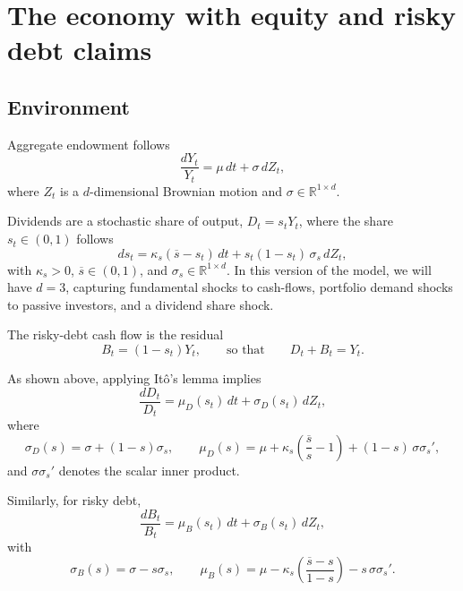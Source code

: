 \documentclass[11pt,english]{article}
\begin{document}
\section{The economy with equity and risky debt claims}

\subsection{Environment}

Aggregate endowment follows
\[
    \frac{dY_t}{Y_t}=\mu\,dt+\sigma\,dZ_t,
\]
where $Z_t$ is a $d$-dimensional Brownian motion and $\sigma\in\mathbb{R}^{1\times d}$.

Dividends are a stochastic share of output, $D_t=s_tY_t$, where the share $s_t\in(0,1)$ follows
\begin{equation}\label{eq:s_process}
    ds_t=\kappa_s(\overline{s}-s_t)\,dt + s_t(1-s_t)\,\sigma_s\,dZ_t,
\end{equation}
with $\kappa_s>0$, $\overline{s}\in(0,1)$, and $\sigma_s\in\mathbb{R}^{1\times d}$. 
In this version of the model, we will have $d = 3$, capturing fundamental shocks to cash-flows, portfolio demand shocks to passive investors, and a dividend share shock.

The risky-debt cash flow is the residual
\[
    B_t=(1-s_t)Y_t,
    \qquad\text{so that}\qquad
    D_t+B_t=Y_t.
\]

As shown above, applying It\^{o}'s lemma implies
\begin{equation}\label{eq:D_dynamics_vector}
    \frac{dD_t}{D_t}=\mu_D(s_t)\,dt+\sigma_D(s_t)\,dZ_t,
\end{equation}
where
\begin{equation}\label{eq:D_mu_sigma_vector}
    \sigma_D(s)=\sigma + (1-s)\sigma_s,
    \qquad
    \mu_D(s)=\mu + \kappa_s\!\left(\frac{\overline{s}}{s}-1\right) + (1-s)\,\sigma\sigma_s',
\end{equation}
and $\sigma\sigma_s'$ denotes the scalar inner product.

Similarly, for risky debt,
\begin{equation}\label{eq:B_dynamics_vector}
    \frac{dB_t}{B_t}=\mu_B(s_t)\,dt+\sigma_B(s_t)\,dZ_t,
\end{equation}
with
\begin{equation}\label{eq:B_mu_sigma_vector}
    \sigma_B(s)=\sigma - s\sigma_s,
    \qquad
    \mu_B(s)=\mu - \kappa_s\!\left(\frac{\overline{s}-s}{1-s}\right) - s\,\sigma\sigma_s'.
\end{equation}
\end{document}
